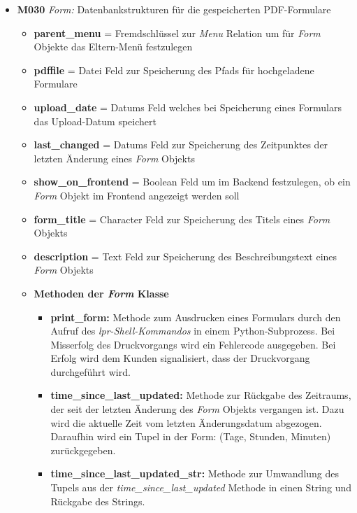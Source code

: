 \begin{itemize}
    \item \textbf{M030} \textit{Form:} Datenbankstrukturen für die gespeicherten PDF-Formulare
    \begin{itemize}
        \item \textbf{parent\_menu} = Fremdschlüssel zur \textit{Menu} Relation um für \textit{Form} Objekte das Eltern-Menü festzulegen
        \item \textbf{pdffile} = Datei Feld zur Speicherung des Pfads für hochgeladene Formulare
        \item \textbf{upload\_date} = Datums Feld welches bei Speicherung eines Formulars das Upload-Datum speichert
        \item \textbf{last\_changed} = Datums Feld zur Speicherung des Zeitpunktes der letzten Änderung eines \textit{Form} Objekts
        \item \textbf{show\_on\_frontend} = Boolean Feld um im Backend festzulegen, ob ein \textit{Form} Objekt im Frontend angezeigt werden soll
        \item \textbf{form\_title} = Character Feld zur Speicherung des Titels eines \textit{Form} Objekts
        \item \textbf{description} = Text Feld zur Speicherung des Beschreibungstext eines \textit{Form} Objekts
    \end{itemize}
    \begin{itemize}
        \item \textbf{Methoden der \textit{Form} Klasse}
        \begin{itemize}
            \item \textbf{print\_form:} Methode zum Ausdrucken eines Formulars durch den Aufruf des \textit{lpr-Shell-Kommandos} in einem Python-Subprozess. Bei Misserfolg des Druckvorgangs wird ein Fehlercode ausgegeben. Bei Erfolg wird dem Kunden signalisiert, dass der Druckvorgang durchgeführt wird.
            \newpage
            \item \textbf{time\_since\_last\_updated:} Methode zur Rückgabe des Zeitraums, der seit der letzten Änderung des \textit{Form} Objekts vergangen ist. Dazu wird die aktuelle Zeit vom letzten Änderungsdatum abgezogen. Daraufhin wird ein Tupel in der Form: (Tage, Stunden, Minuten) zurückgegeben.
            \item \textbf{time\_since\_last\_updated\_str:} Methode zur Umwandlung des Tupels aus der \textit{time\_since\_last\_updated} Methode in einen String und Rückgabe des Strings.
        \end{itemize}
    \end{itemize}
\end{itemize}